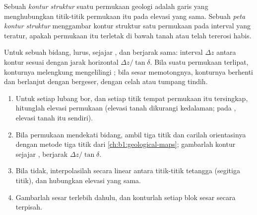 \begin{definition}\label{def:b1:cross-sections:structure-contour}
Sebuah \emph{kontur struktur} suatu permukaan geologi adalah garis yang menghubungkan titik-titik permukaan itu pada elevasi yang sama. Sebuah \emph{peta kontur struktur} menggambar kontur struktur satu permukaan pada interval yang teratur, apakah permukaan itu terletak di bawah tanah atau telah tererosi habis.
\end{definition}

Untuk sebuah bidang,  lurus, sejajar , dan berjarak sama: interval $\Delta z$ antara kontur sesuai dengan jarak horizontal $\Delta z/\tan\delta$. Bila suatu permukaan terlipat, konturnya melengkung mengelilingi ; bila sesar memotongnya, konturnya berhenti dan berlanjut dengan bergeser, dengan celah atau tumpang tindih.

\begin{method}\label{met:b1:cross-sections:structure-contours}
\begin{enumerate}
  \item Untuk setiap lubang bor, dan setiap titik tempat permukaan itu tersingkap, hitunglah elevasi permukaan (elevasi tanah dikurangi kedalaman; pada , elevasi tanah itu sendiri).
  \item Bila permukaan mendekati bidang, ambil tiga titik dan carilah orientasinya dengan metode tiga titik dari \cref{ch:b1:geological-maps}; gambarlah kontur sejajar , berjarak $\Delta z/\tan\delta$.
  \item Bila tidak, interpolasilah secara linear antara titik-titik tetangga (segitiga titik), dan hubungkan elevasi yang sama.
  \item Gambarlah sesar terlebih dahulu, dan konturlah setiap blok sesar secara terpisah.
\end{enumerate}
\end{method}

